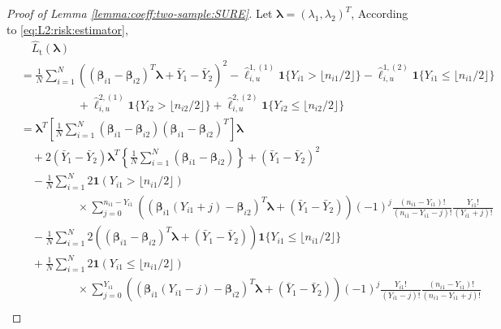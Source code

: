 \documentclass[12pt,letterpaper]{article}
\begin{document}
\begin{proof}[Proof of Lemma \ref{lemma:coeff:two-sample:SURE}]
Let $\boldsymbol{\lambda}=(\lambda_1,\lambda_2)^T$, 
According to \eqref{eq:L2:risk:estimator},
\begin{equation}\label{eq:L:SURE:two-sample:ML}
\begin{array}{rl}
    &\quad\hat{L}_{\mathrm{t}}(\boldsymbol{\lambda})\\
    &\displaystyle=\frac{1}{N}\sum_{i=1}^N\left((\boldsymbol{\beta}_{i1}-\boldsymbol{\beta}_{i2})^T\boldsymbol{\lambda}+\bar{Y}_1-\bar{Y}_2\right)^2-\hat{\ell}_{i,u}^{1,(1)}\mathbf{1}\{Y_{i1}>\lfloor n_{i1}/2\rfloor\}-\hat{\ell}_{i,u}^{1,(2)}\mathbf{1}\{Y_{i1}\leq\lfloor n_{i1}/2\rfloor\}\\
    &\quad\quad\quad\quad\quad\displaystyle+\hat{\ell}_{i,u}^{2,(1)}\mathbf{1}\{Y_{i2}>\lfloor n_{i2}/2\rfloor\}+\hat{\ell}_{i,u}^{2,(2)}\mathbf{1}\{Y_{i2}\leq\lfloor n_{i2}/2\rfloor\}\\
    &\displaystyle=\boldsymbol{\lambda}^T\left[\frac{1}{N}\sum_{i=1}^N(\boldsymbol{\beta}_{i1}-\boldsymbol{\beta}_{i2})(\boldsymbol{\beta}_{i1}-\boldsymbol{\beta}_{i2})^T\right]\boldsymbol{\lambda}\\
    &\displaystyle\quad+2(\bar{Y}_1-\bar{Y}_2)\boldsymbol{\lambda}^T\left\{\frac{1}{N}\sum_{i=1}^N(\boldsymbol{\beta}_{i1}-\boldsymbol{\beta}_{i2})\right\}+(\bar{Y}_1-\bar{Y}_2)^2\\
    &\displaystyle\quad-\frac{1}{N}\sum_{i=1}^N2\mathbf{1}(Y_{i1} > \lfloor n_{i1}/2\rfloor)\\
    &\displaystyle\quad\quad\quad\quad\quad\times\sum_{j=0}^{n_{i1}-Y_{i1}}\!\!\!\left((\boldsymbol{\beta}_{i1}(Y_{i1}+j)-\boldsymbol{\beta}_{i2})^T\boldsymbol{\lambda}+(\bar{Y}_1-\bar{Y}_2)\right)(-1)^{j}\frac{(n_{i1}-Y_{i1})!}{(n_{i1}-Y_{i1}-j)!}\frac{Y_{i1}!}{(Y_{i1}+j)!}\\
    &\displaystyle\quad-\frac{1}{N}\sum_{i=1}^N2\left((\boldsymbol{\beta}_{i1}-\boldsymbol{\beta}_{i2})^T\boldsymbol{\lambda}+(\bar{Y}_{1}-\bar{Y}_2)\right)\mathbf{1}\{Y_{i1}\leq \lfloor n_{i1}/2\rfloor\}\\
    &\displaystyle\quad+\frac{1}{N}\sum_{i=1}^N2\mathbf{1}(Y_{i1}\leq \lfloor n_{i1}/2\rfloor)\\
    &\displaystyle\quad\quad\quad\quad\quad\times\sum_{j=0}^{Y_{i1}}\left((\boldsymbol{\beta}_{i1}(Y_{i1}-j)-\boldsymbol{\beta}_{i2})^T\boldsymbol{\lambda}+(\bar{Y}_1-\bar{Y}_2)\right)(-1)^{j}\frac{Y_{i1}!}{(Y_{i1}-j)!}\frac{(n_{i1} - Y_{i1})!}{(n_{i1}-Y_{i1}+j)!}\\

\end{array}
\end{equation}
\end{proof}
\end{document}
